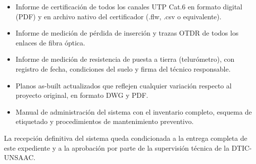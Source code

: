 \begin{itemize}
    \item Informe de certificación de todos los canales UTP Cat.6 en formato
    digital (PDF) y en archivo nativo del certificador (.flw, .csv o equivalente).

    \item Informe de medición de pérdida de inserción y trazas OTDR de todos los
    enlaces de fibra óptica.

    \item Informe de medición de resistencia de puesta a tierra (telurómetro),
    con registro de fecha, condiciones del suelo y firma del técnico responsable.

    \item Planos as-built actualizados que reflejen cualquier variación respecto
    al proyecto original, en formato DWG y PDF.

    \item Manual de administración del sistema con el inventario completo,
    esquema de etiquetado y procedimientos de mantenimiento preventivo.
\end{itemize}

La recepción definitiva del sistema queda condicionada a la entrega completa
de este expediente y a la aprobación por parte de la supervisión técnica de
la DTIC-UNSAAC.